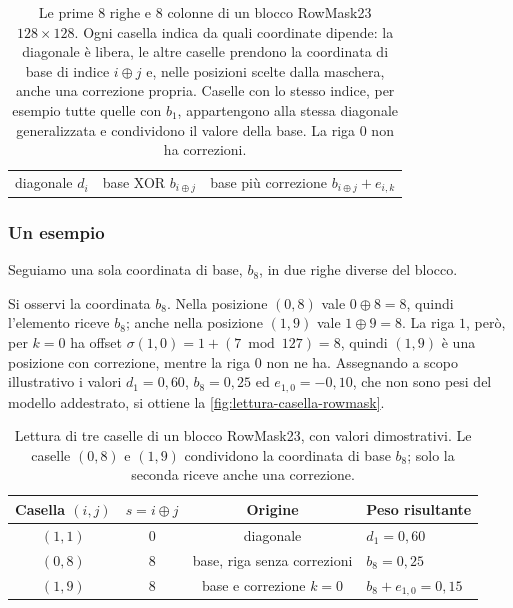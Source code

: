 \begin{table}[H]
\medskip
\begin{tabular}{lll}
\cellcolor{steraBlu!30}\phantom{xx} diagonale $d_i$ &
\cellcolor{steraGrigio!12}\phantom{xx} base XOR $b_{i\oplus j}$ &
\cellcolor{steraArancio!40}\phantom{xx} base più correzione $b_{i\oplus j}+e_{i,k}$
\end{tabular}
\caption{Le prime 8 righe e 8 colonne di un blocco RowMask23 $128\times128$. Ogni casella indica da quali coordinate dipende: la diagonale è libera, le altre caselle prendono la coordinata di base di indice $i\oplus j$ e, nelle posizioni scelte dalla maschera, anche una correzione propria. Caselle con lo stesso indice, per esempio tutte quelle con $b_1$, appartengono alla stessa diagonale generalizzata e condividono il valore della base. La riga 0 non ha correzioni.}
\label{tab:struttura-blocco}
\end{table}

\subsubsection{Un esempio}
\label{sec:guida-visiva-rowmask}
\label{sec:esempio-numerico-rowmask}

Seguiamo una sola coordinata di base, $b_8$, in due righe diverse del blocco.

Si osservi la coordinata $b_8$. Nella posizione $(0,8)$ vale $0\oplus8=8$, quindi l'elemento riceve $b_8$; anche nella posizione $(1,9)$ vale $1\oplus9=8$. La riga $1$, però, per $k=0$ ha offset $\sigma(1,0)=1+(7\bmod127)=8$, quindi $(1,9)$ è una posizione con correzione, mentre la riga $0$ non ne ha. Assegnando a scopo illustrativo i valori $d_1=0{,}60$, $b_8=0{,}25$ ed $e_{1,0}=-0{,}10$, che non sono pesi del modello addestrato, si ottiene la \autoref{fig:lettura-casella-rowmask}.

\begin{table}[H]
\centering
\small
\begin{tabular}{cccl}
\toprule
Casella $(i,j)$ & $s=i\oplus j$ & Origine & Peso risultante \\
\midrule
$(1,1)$ & $0$ & diagonale & $d_1 = 0{,}60$ \\
$(0,8)$ & $8$ & base, riga senza correzioni & $b_8 = 0{,}25$ \\
$(1,9)$ & $8$ & base e correzione $k=0$ & $b_8 + e_{1,0} = 0{,}15$ \\
\bottomrule
\end{tabular}
\caption{Lettura di tre caselle di un blocco RowMask23, con valori dimostrativi. Le caselle $(0,8)$ e $(1,9)$ condividono la coordinata di base $b_8$; solo la seconda riceve anche una correzione.}
\label{fig:lettura-casella-rowmask}
\end{table}

